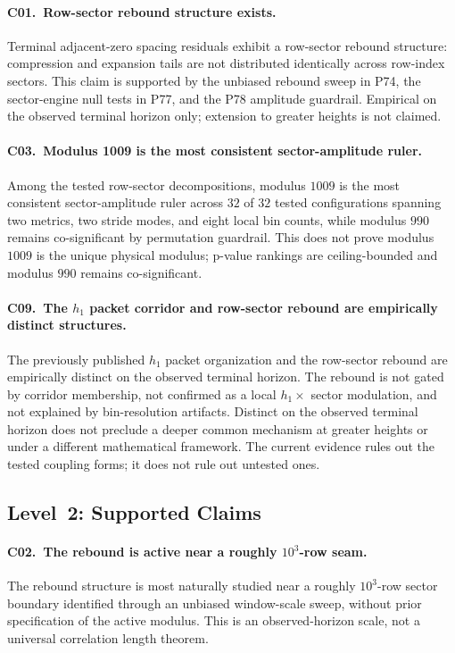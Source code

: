 \documentclass[11pt]{article}
\begin{document}
\paragraph{C01.\ Row-sector rebound structure exists.}
Terminal adjacent-zero spacing residuals exhibit a row-sector rebound
structure: compression and expansion tails are not distributed
identically across row-index sectors. This claim is supported by the
unbiased rebound sweep in P74, the sector-engine null tests in P77, and
the P78 amplitude guardrail. Empirical on the observed terminal horizon
only; extension to greater heights is not claimed.

\paragraph{C03.\ Modulus 1009 is the most consistent sector-amplitude
ruler.}
Among the tested row-sector decompositions, modulus $1009$ is the most
consistent sector-amplitude ruler across $32$ of $32$ tested
configurations spanning two metrics, two stride modes, and eight local
bin counts, while modulus $990$ remains co-significant by permutation
guardrail. This does not prove modulus $1009$ is the unique physical
modulus; p-value rankings are ceiling-bounded and modulus $990$ remains
co-significant.

\paragraph{C09.\ The $h_1$ packet corridor and row-sector rebound are
empirically distinct structures.}
The previously published $h_1$ packet organization and the row-sector
rebound are empirically distinct on the observed terminal horizon. The
rebound is not gated by corridor membership, not confirmed as a local
$h_1 \times$ sector modulation, and not explained by bin-resolution
artifacts. Distinct on the observed terminal horizon does not preclude
a deeper common mechanism at greater heights or under a different
mathematical framework. The current evidence rules out the tested
coupling forms; it does not rule out untested ones.

\subsection{Level~2: Supported Claims}

\paragraph{C02.\ The rebound is active near a roughly $10^3$-row seam.}
The rebound structure is most naturally studied near a roughly
$10^3$-row sector boundary identified through an unbiased window-scale
sweep, without prior specification of the active modulus. This is an
observed-horizon scale, not a universal correlation length theorem.
\end{document}
